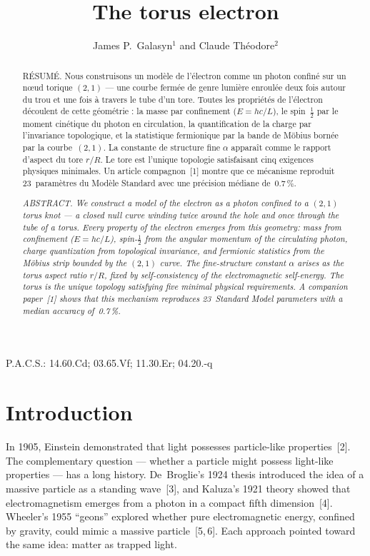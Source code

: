 \documentclass[10pt,twoside,a5paper]{article}
\title{The torus electron}
\author{James P.\ Galasyn$^{1}$ and Claude Th\'eodore$^{2}$}
\def\pacs#1{\LP P.A.C.S.: #1}
\begin{document}
\maketitle

\vskip 1cm
\begin{abstract}
R\'ESUM\'E. Nous construisons un mod\`ele de l'\'electron comme un photon confin\'e sur un n\oe ud torique $(2,1)$ --- une courbe ferm\'ee de genre lumi\`ere enroul\'ee deux fois autour du trou et une fois \`a travers le tube d'un tore.
Toutes les propri\'et\'es de l'\'electron d\'ecoulent de cette g\'eom\'etrie : la masse par confinement ($E = hc/L$), le spin~$\frac{1}{2}$ par le moment cin\'etique du photon en circulation, la quantification de la charge par l'invariance topologique, et la statistique fermionique par la bande de M\"obius born\'ee par la courbe~$(2,1)$.
La constante de structure fine $\alpha$ appara\^it comme le rapport d'aspect du tore $r/R$. Le tore est l'unique topologie satisfaisant cinq exigences physiques minimales.
Un article compagnon~[1] montre que ce m\'ecanisme reproduit 23~param\`etres du Mod\`ele Standard avec une pr\'ecision m\'ediane de~0.7\,\%.

{\it
ABSTRACT. We construct a model of the electron as a photon confined to a $(2,1)$ torus knot --- a closed null curve winding twice around the hole and once through the tube of a torus.
Every property of the electron emerges from this geometry: mass from confinement ($E = hc/L$), spin-$\frac{1}{2}$ from the angular momentum of the circulating photon, charge quantization from topological invariance, and fermionic statistics from the M\"obius strip bounded by the $(2,1)$ curve.
The fine-structure constant $\alpha$ arises as the torus aspect ratio $r/R$, fixed by self-consistency of the electromagnetic self-energy. The torus is the unique topology satisfying five minimal physical requirements.
A companion paper~[1] shows that this mechanism reproduces 23~Standard Model parameters with a median accuracy of~0.7\,\%.}
\end{abstract}
\pacs{14.60.Cd; 03.65.Vf; 11.30.Er; 04.20.-q}


\section{Introduction}

In 1905, Einstein demonstrated that light possesses particle-like properties~[2]. The complementary question --- whether a particle might possess light-like properties --- has a long history. De~Broglie's 1924 thesis introduced the idea of a massive particle as a standing wave~[3], and Kaluza's 1921 theory showed that electromagnetism emerges from a photon in a compact fifth dimension~[4]. Wheeler's 1955 ``geons'' explored whether pure electromagnetic energy, confined by gravity, could mimic a massive particle~[5,\,6]. Each approach pointed toward the same idea: matter as trapped light.
\end{document}
